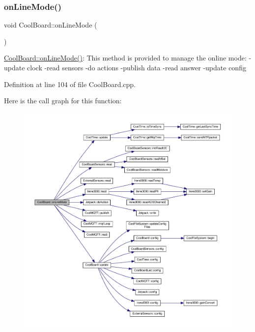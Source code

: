 \subsubsection{\texorpdfstring{on\+Line\+Mode()}{onLineMode()}}
{\footnotesize\ttfamily void Cool\+Board\+::on\+Line\+Mode (\begin{DoxyParamCaption}{ }\end{DoxyParamCaption})}

\hyperlink{class_cool_board_aa0bbc4bc605e35618d18e68795c61363}{Cool\+Board\+::on\+Line\+Mode()}\+: This method is provided to manage the online mode\+: -\/update clock -\/read sensors -\/do actions -\/publish data -\/read answer -\/update config 

Definition at line 104 of file Cool\+Board.\+cpp.

Here is the call graph for this function\+:\nopagebreak
\begin{figure}[H]
\begin{center}
\leavevmode
\includegraphics[width=350pt]{class_cool_board_aa0bbc4bc605e35618d18e68795c61363_cgraph}
\end{center}
\end{figure}
\mbox{\label{class_cool_board_a486507b8f0981d3cc671ed31c2145755}} 
